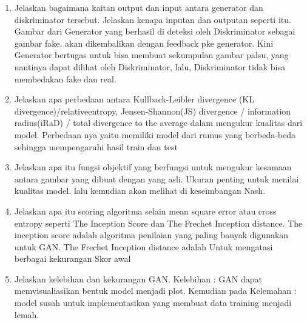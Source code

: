 \begin{enumerate}
    \item Jelaskan bagaimana kaitan output dan input antara generator dan diskriminator tersebut. Jelaskan kenapa inputan dan outputan seperti itu.
	\hfill\break
	Gambar dari Generator yang berhasil di deteksi oleh Diskriminator sebagai gambar fake, akan dikembalikan dengan feedback pke generator. Kini Generator bertugas untuk bisa membuat sekumpulan gambar palsu, yang nantinya dapat dilihat oleh Diskriminator, lalu, Diskriminator tidak bisa membedakan fake dan real.

	\item Jelaskan apa perbedaan antara Kullback-Leibler divergence (KL divergence)/relativeentropy, Jensen-Shannon(JS) divergence / information radius(iRaD) / total divergence to the average dalam mengukur kualitas dari model.
	\hfill\break
	Perbedaan nya yaitu memiliki model dari rumus yang berbeda-beda sehingga mempengaruhi hasil train dan test

	\item Jelaskan apa itu fungsi objektif yang berfungsi untuk mengukur kesamaan antara gambar yang dibuat dengan yang asli.
    \hfill\break
    Ukuran penting untuk menilai kualitas model. lalu kemudian akan melihat di keseimbangan Nash.

	\item Jelaskan apa itu scoring algoritma selain mean square error atau cross entropy seperti The Inception Score dan The Frechet Inception distance.
	\hfill\break
	The inception score adalah algoritma penilaian yang paling banyak digunakan untuk GAN. The Frechet Inception distance adalah Untuk mengatasi berbagai kekurangan Skor awal

	\item Jelaskan kelebihan dan kekurangan GAN.
	\hfill\break
	Kelebihan : GAN dapat memvisualiasikan bentuk model menjadi plot. Kemudian pada Kelemahan : model susah untuk implementasikan yang membuat data training menjadi lemah.
\end{enumerate}

